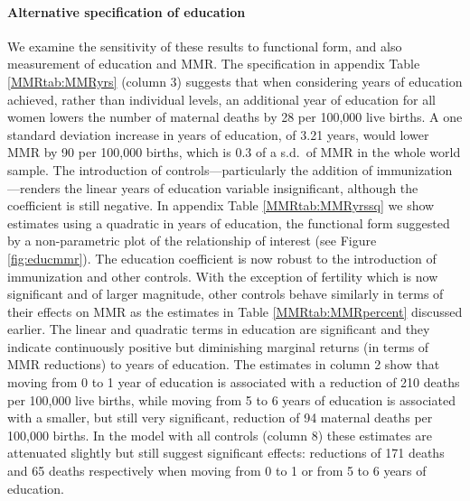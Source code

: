 \documentclass{article}[12pt,subeqn]
\begin{document}
\begin{spacing}{1.4}
\paragraph{Alternative specification of education}
We examine the sensitivity of these results to functional form, and also
measurement of education and MMR.  The specification in appendix Table
\ref{MMRtab:MMRyrs} (column 3) suggests that when considering years of
education achieved, rather than individual levels, an additional year of
education for all women lowers the number of maternal deaths by 28 per
100,000 live births. A one standard deviation increase in years of 
education, of 3.21 years, would lower MMR by 90 per 100,000 births, which
is 0.3 of a s.d.\ of MMR in the whole world sample. The introduction of
controls---particularly the addition of immunization---renders the linear
years of education variable insignificant, although the coefficient is
still negative. In appendix Table \ref{MMRtab:MMRyrssq} we show estimates
using a quadratic in years of education, the functional form suggested by
a non-parametric plot of the relationship of interest (see Figure
\ref{fig:educmmr}). The education coefficient is now robust to the
introduction of immunization and other controls. With the exception of 
fertility which is now significant and of larger magnitude, other controls 
behave similarly in terms of their effects on MMR as the estimates in Table 
\ref{MMRtab:MMRpercent} discussed earlier. The linear and quadratic terms in
education are significant and they indicate continuously positive but diminishing
marginal returns (in terms of MMR reductions) to years of education. The estimates
in column 2 show that moving from 0 to 1 year of education is associated with a 
reduction of 210 deaths per 100,000 live births, while moving from 5 to 6 years 
of education is associated with a smaller, but still very significant, reduction 
of 94 maternal deaths per 100,000 births. In the model with all controls (column 
8) these estimates are attenuated slightly but still suggest significant effects: 
reductions of 171 deaths and 65 deaths respectively when moving from 0 to 1 or 
from 5 to 6 years of education.


\end{spacing}
\end{document}
